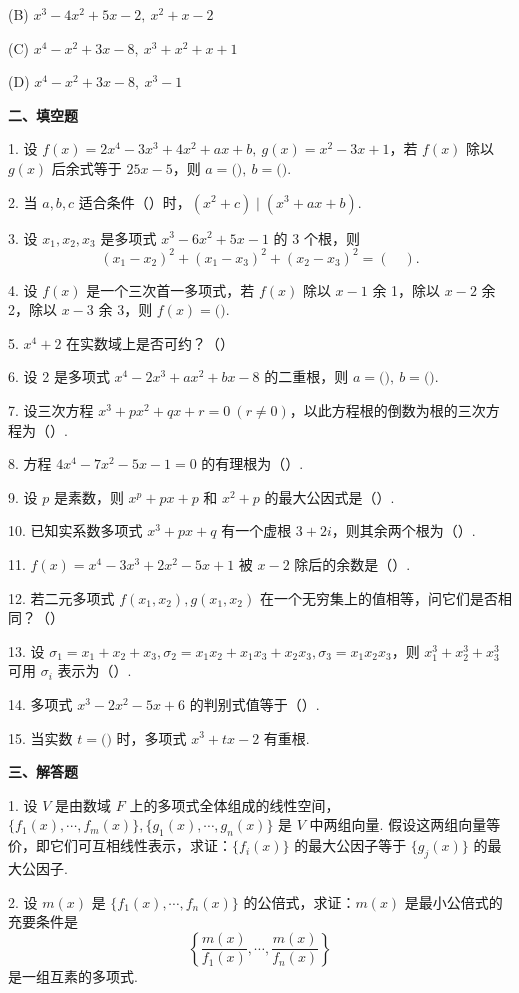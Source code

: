 \documentclass[UTF8, 12pt, fontset=fandol, oneside]{ctexart}
\begin{document}
(B) $x^3-4x^2+5x-2,\ x^2+x-2$

(C) $x^4-x^2+3x-8,\ x^3+x^2+x+1$

(D) $x^4-x^2+3x-8,\ x^3-1$

\noindent\textbf{二、填空题}

1. 设 $f(x)=2x^4-3x^3+4x^2+ax+b,\ g(x)=x^2-3x+1$，若 $f(x)$ 除以 $g(x)$ 后余式等于 $25x-5$，则 $a=($\quad $),\ b=($\quad $)$.

2. 当 $a,b,c$ 适合条件（\quad ）时，$(x^2+c)\mid(x^3+ax+b)$.

3. 设 $x_1,x_2,x_3$ 是多项式 $x^3-6x^2+5x-1$ 的 3 个根，则
\[
(x_1-x_2)^2+(x_1-x_3)^2+(x_2-x_3)^2=(\quad).
\]

4. 设 $f(x)$ 是一个三次首一多项式，若 $f(x)$ 除以 $x-1$ 余 1，除以 $x-2$ 余 2，除以 $x-3$ 余 3，则 $f(x)=($\quad $)$.

5. $x^4+2$ 在实数域上是否可约？（\quad ）

6. 设 2 是多项式 $x^4-2x^3+ax^2+bx-8$ 的二重根，则 $a=($\quad $),\ b=($\quad $)$.

7. 设三次方程 $x^3+px^2+qx+r=0\ (r\ne0)$，以此方程根的倒数为根的三次方程为（\quad ）.

8. 方程 $4x^4-7x^2-5x-1=0$ 的有理根为（\quad ）.

9. 设 $p$ 是素数，则 $x^p+px+p$ 和 $x^2+p$ 的最大公因式是（\quad ）.

10. 已知实系数多项式 $x^3+px+q$ 有一个虚根 $3+2i$，则其余两个根为（\quad ）.

11. $f(x)=x^4-3x^3+2x^2-5x+1$ 被 $x-2$ 除后的余数是（\quad ）.

12. 若二元多项式 $f(x_1,x_2),g(x_1,x_2)$ 在一个无穷集上的值相等，问它们是否相同？（\quad ）

13. 设 $\sigma_1=x_1+x_2+x_3,\sigma_2=x_1x_2+x_1x_3+x_2x_3,\sigma_3=x_1x_2x_3$，则 $x_1^3+x_2^3+x_3^3$ 可用 $\sigma_i$ 表示为（\quad ）.

14. 多项式 $x^3-2x^2-5x+6$ 的判别式值等于（\quad ）.

15. 当实数 $t=($\quad $)$ 时，多项式 $x^3+tx-2$ 有重根.

\noindent\textbf{三、解答题}

1. 设 $V$ 是由数域 $F$ 上的多项式全体组成的线性空间，$\{f_1(x),\cdots,f_m(x)\},\{g_1(x),\cdots,g_n(x)\}$ 是 $V$ 中两组向量. 假设这两组向量等价，即它们可互相线性表示，求证：$\{f_i(x)\}$ 的最大公因子等于 $\{g_j(x)\}$ 的最大公因子.

2. 设 $m(x)$ 是 $\{f_1(x),\cdots,f_n(x)\}$ 的公倍式，求证：$m(x)$ 是最小公倍式的充要条件是
\[
\left\{\frac{m(x)}{f_1(x)},\cdots,\frac{m(x)}{f_n(x)}\right\}
\]
是一组互素的多项式.
\end{document}
